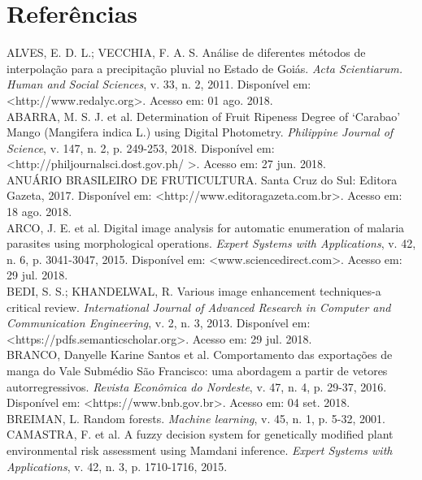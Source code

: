 \chapter{Referências}

\noindent ALVES, E. D. L.; VECCHIA, F. A. S. Análise de diferentes métodos de interpolação para a precipitação pluvial no Estado de Goiás. \textit{Acta Scientiarum. Human and Social Sciences}, v. 33, n. 2, 2011. Disponível em: <http://www.redalyc.org>. Acesso em: 01 ago. 2018.
\\

\noindent ABARRA, M. S. J. et al. Determination of Fruit Ripeness Degree of ‘Carabao’ Mango (Mangifera indica L.) using Digital Photometry. \textit{Philippine Journal of Science}, v. 147, n. 2, p. 249-253, 2018. Disponível em: <http://philjournalsci.dost.gov.ph/ >. Acesso em: 27 jun. 2018.
\\

\noindent ANUÁRIO BRASILEIRO DE FRUTICULTURA. Santa Cruz do Sul: Editora Gazeta, 2017. Disponível em: <http://www.editoragazeta.com.br>. Acesso em: 18 ago. 2018.
\\

\noindent ARCO, J. E. et al. Digital image analysis for automatic enumeration of malaria parasites using morphological operations. \textit{Expert Systems with Applications}, v. 42, n. 6, p. 3041-3047, 2015. Disponível em: <www.sciencedirect.com>. Acesso em: 29 jul. 2018.
\\

\noindent BEDI, S. S.; KHANDELWAL, R. Various image enhancement techniques-a critical review. \textit{International Journal of Advanced Research in Computer and Communication Engineering}, v. 2, n. 3, 2013. Disponível em: <https://pdfs.semanticscholar.org>. Acesso em: 29 jul. 2018.
\\

\noindent BRANCO, Danyelle Karine Santos et al. Comportamento das exportações de manga do Vale Submédio São Francisco: uma abordagem a partir de vetores autorregressivos. \textit{Revista Econômica do Nordeste}, v. 47, n. 4, p. 29-37, 2016. Disponível em: <https://www.bnb.gov.br>. Acesso em: 04 set. 2018.
\\

\noindent BREIMAN, L. Random forests. \textit{Machine learning}, v. 45, n. 1, p. 5-32, 2001.
\\

\noindent CAMASTRA, F. et al. A fuzzy decision system for genetically modified plant environmental risk assessment using Mamdani inference. \textit{Expert Systems with Applications}, v. 42, n. 3, p. 1710-1716, 2015.
\\


